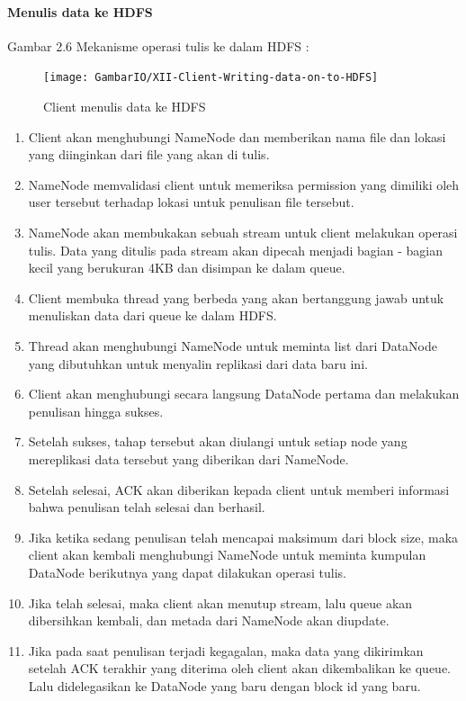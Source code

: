 		\paragraph{Menulis data ke HDFS}
		Gambar 2.6
		Mekanisme operasi tulis ke dalam HDFS :
		
		\begin{figure}[ht]
			\centering
			\texttt{[image: GambarIO/XII-Client-Writing-data-on-to-HDFS]}
			\caption[Client menulis data ke HDFS]{Client menulis data ke HDFS}
			\label{fig:XII-Client-Writing-data-on-to-HDFS}
		\end{figure}
			
			
		\begin{enumerate}
			\item Client akan menghubungi NameNode dan memberikan nama file dan lokasi yang diinginkan dari file yang akan di tulis.
			\item NameNode memvalidasi client untuk memeriksa permission yang dimiliki oleh user tersebut terhadap lokasi untuk penulisan file tersebut.
			\item NameNode akan membukakan sebuah stream untuk client melakukan operasi tulis. Data yang ditulis pada stream akan dipecah menjadi bagian - bagian kecil yang berukuran 4KB dan disimpan ke dalam queue.
			\item Client membuka thread yang berbeda yang akan bertanggung jawab untuk menuliskan data dari queue ke dalam HDFS.
			\item Thread akan menghubungi NameNode untuk meminta list dari DataNode yang dibutuhkan untuk menyalin replikasi dari data baru ini.
			\item Client akan menghubungi secara langsung DataNode pertama dan melakukan penulisan hingga sukses.
			\item Setelah sukses, tahap tersebut akan diulangi untuk setiap node yang mereplikasi data tersebut yang diberikan dari NameNode.
			\item Setelah selesai, ACK akan diberikan kepada client untuk memberi informasi bahwa penulisan telah selesai dan berhasil.
			\item Jika ketika sedang penulisan telah mencapai maksimum dari block size, maka client akan kembali menghubungi NameNode untuk meminta kumpulan DataNode berikutnya yang dapat dilakukan operasi tulis.
			\item Jika telah selesai, maka client akan menutup stream, lalu queue akan dibersihkan kembali, dan metada dari NameNode akan diupdate.
			\item Jika pada saat penulisan terjadi kegagalan, maka data yang dikirimkan setelah ACK terakhir yang diterima oleh client akan dikembalikan ke queue. Lalu didelegasikan ke DataNode yang baru dengan block id yang baru.
		\end{enumerate}
		

